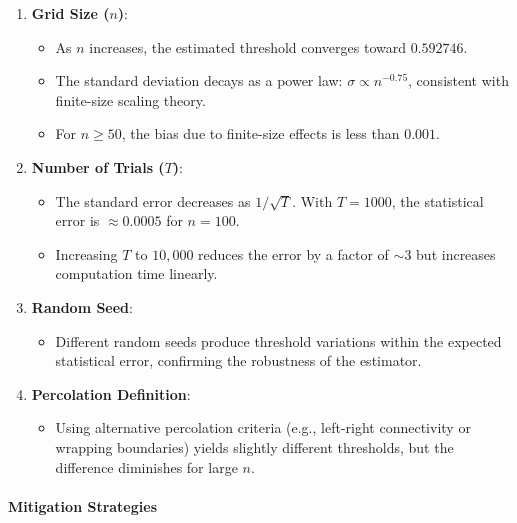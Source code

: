 \documentclass[11pt]{article}
\providecommand{\tightlist}{%
      \setlength{\itemsep}{0pt}\setlength{\parskip}{0pt}}
\begin{document}
\begin{enumerate}
\def\labelenumi{\arabic{enumi}.}
\item
  \textbf{Grid Size (\(n\))}:

  \begin{itemize}
  \tightlist
  \item
    As \(n\) increases, the estimated threshold converges toward
    \(0.592746\).
  \item
    The standard deviation decays as a power law:
    \(\sigma\propto n^{-0.75}\), consistent with finite-size scaling
    theory.
  \item
    For \(n\geq50\), the bias due to finite-size effects is less than
    \(0.001\).
  \end{itemize}
\item
  \textbf{Number of Trials (\(T\))}:

  \begin{itemize}
  \tightlist
  \item
    The standard error decreases as \(1/\sqrt{T}\). With \(T=1000\), the
    statistical error is \(\approx0.0005\) for \(n=100\).
  \item
    Increasing \(T\) to \(10,000\) reduces the error by a factor of
    \(\sim3\) but increases computation time linearly.
  \end{itemize}
\item
  \textbf{Random Seed}:

  \begin{itemize}
  \tightlist
  \item
    Different random seeds produce threshold variations within the
    expected statistical error, confirming the robustness of the
    estimator.
  \end{itemize}
\item
  \textbf{Percolation Definition}:

  \begin{itemize}
  \tightlist
  \item
    Using alternative percolation criteria (e.g., left-right
    connectivity or wrapping boundaries) yields slightly different
    thresholds, but the difference diminishes for large \(n\).
  \end{itemize}
\end{enumerate}

\paragraph{Mitigation Strategies}\label{mitigation-strategies}
\end{document}
